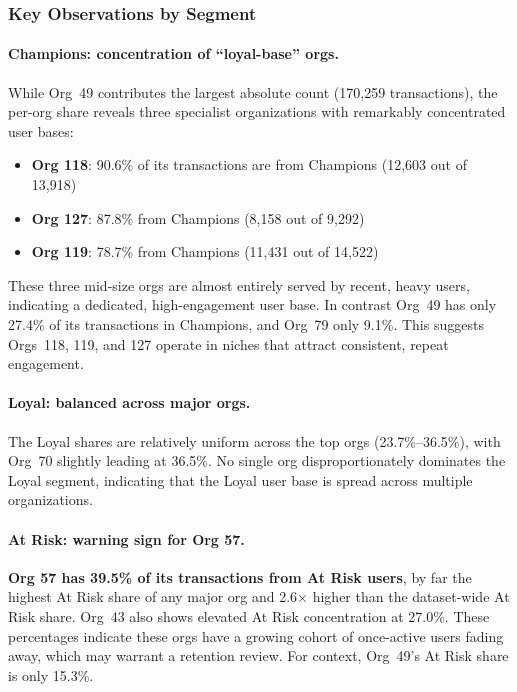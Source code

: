 \documentclass[11pt,a4paper]{article}
\begin{document}
\subsubsection{Key Observations by Segment}

\paragraph{Champions: concentration of ``loyal-base'' orgs.}
While Org~49 contributes the largest absolute count (170{,}259 transactions), the per-org share reveals three specialist organizations with remarkably concentrated user bases:
\begin{itemize}
    \item \textbf{Org 118}: 90.6\% of its transactions are from Champions (12{,}603 out of 13{,}918)
    \item \textbf{Org 127}: 87.8\% from Champions (8{,}158 out of 9{,}292)
    \item \textbf{Org 119}: 78.7\% from Champions (11{,}431 out of 14{,}522)
\end{itemize}
These three mid-size orgs are almost entirely served by recent, heavy users, indicating a dedicated, high-engagement user base. In contrast Org~49 has only 27.4\% of its transactions in Champions, and Org~79 only 9.1\%. This suggests Orgs~118, 119, and 127 operate in niches that attract consistent, repeat engagement.

\paragraph{Loyal: balanced across major orgs.}
The Loyal shares are relatively uniform across the top orgs (23.7\%--36.5\%), with Org~70 slightly leading at 36.5\%. No single org disproportionately dominates the Loyal segment, indicating that the Loyal user base is spread across multiple organizations.

\paragraph{At Risk: warning sign for Org 57.}
\textbf{Org 57 has 39.5\% of its transactions from At Risk users}, by far the highest At Risk share of any major org and 2.6$\times$ higher than the dataset-wide At Risk share. Org~43 also shows elevated At Risk concentration at 27.0\%. These percentages indicate these orgs have a growing cohort of once-active users fading away, which may warrant a retention review. For context, Org~49's At Risk share is only 15.3\%.
\end{document}

